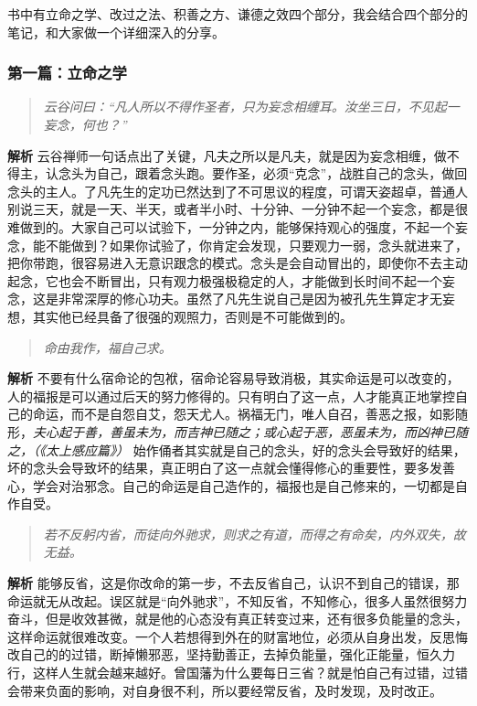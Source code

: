 书中有立命之学、改过之法、积善之方、谦德之效四个部分，我会结合四个部分的笔记，和大家做一个详细深入的分享。

\subsubsection{第一篇：立命之学}

\begin{quote}\it
    云谷问曰：“凡人所以不得作圣者，只为妄念相缠耳。汝坐三日，不见起一妄念，何也？”
\end{quote}

\textbf{解析} 云谷禅师一句话点出了关键，凡夫之所以是凡夫，就是因为妄念相缠，做不得主，认念头为自己，跟着念头跑。要作圣，必须“克念”，战胜自己的念头，做回念头的主人。了凡先生的定功已然达到了不可思议的程度，可谓天姿超卓，普通人别说三天，就是一天、半天，或者半小时、十分钟、一分钟不起一个妄念，都是很难做到的。大家自己可以试验下，一分钟之内，能够保持观心的强度，不起一个妄念，能不能做到？如果你试验了，你肯定会发现，只要观力一弱，念头就进来了，把你带跑，很容易进入无意识跟念的模式。念头是会自动冒出的，即使你不去主动起念，它也会不断冒出，只有观力极强极稳定的人，才能做到长时间不起一个妄念，这是非常深厚的修心功夫。虽然了凡先生说自己是因为被孔先生算定才无妄想，其实他已经具备了很强的观照力，否则是不可能做到的。

\begin{quote}\it
    命由我作，福自己求。
\end{quote}

\textbf{解析} 不要有什么宿命论的包袱，宿命论容易导致消极，其实命运是可以改变的，人的福报是可以通过后天的努力修得的。只有明白了这一点，人才能真正地掌控自己的命运，而不是自怨自艾，怨天尤人。祸福无门，唯人自召，善恶之报，如影随形，\textit{夫心起于善，善虽未为，而吉神已随之；或心起于恶，恶虽未为，而凶神已随之，（《太上感应篇》）} 始作俑者其实就是自己的念头，好的念头会导致好的结果，坏的念头会导致坏的结果，真正明白了这一点就会懂得修心的重要性，要多发善心，学会对治邪念。自己的命运是自己造作的，福报也是自己修来的，一切都是自作自受。

\begin{quote}\it
    若不反躬内省，而徒向外驰求，则求之有道，而得之有命矣，内外双失，故无益。
\end{quote}

\textbf{解析} 能够反省，这是你改命的第一步，不去反省自己，认识不到自己的错误，那命运就无从改起。误区就是“向外驰求”，不知反省，不知修心，很多人虽然很努力奋斗，但是收效甚微，就是他的心态没有真正转变过来，还有很多负能量的念头，这样命运就很难改变。一个人若想得到外在的财富地位，必须从自身出发，反思悔改自己的的过错，断掉懒邪恶，坚持勤善正，去掉负能量，强化正能量，恒久力行，这样人生就会越来越好。曾国藩为什么要每日三省？就是怕自己有过错，过错会带来负面的影响，对自身很不利，所以要经常反省，及时发现，及时改正。

